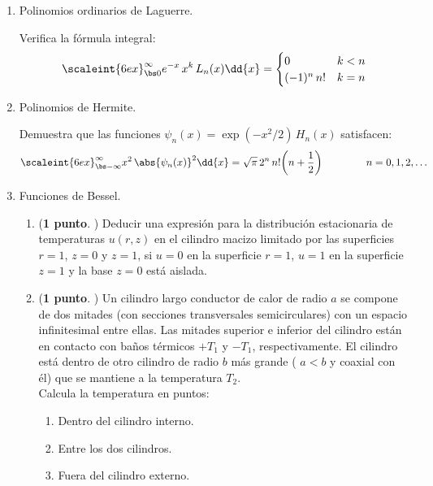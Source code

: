 \begin{enumerate}
\item Polinomios ordinarios de Laguerre.
\par
\noindent
Verifica la fórmula integral:
\begin{align*}
\scaleint{6ex}_{\bs 0}^{\infty} e^{-x} \, x^{k} \, L_{n} (x) \dd{x} = \begin{cases}
0 & k < n \\
(-1)^{n} \, n! & k = n
\end{cases}
\end{align*}
\item Polinomios de Hermite.
\par
\noindent
Demuestra que las funciones $\psi_{n} (x) = \exp(-x^{2}/2) \, H_{n} (x)$ satisfacen:
\begin{align*}
\scaleint{6ex}_{\bs -\infty}^{\infty} x^{2} \, \abs{\psi_{n} (x)}^{2} \dd{x} = \sqrt{\pi} \, 2^{n} \, n! \bigg( n + \dfrac{1}{2} \bigg) \hspace{1.5cm} n = 0, 1, 2, \ldots
\end{align*}
\item Funciones de Bessel.
\begin{enumerate}
\item (\textbf{1 punto}. ) Deducir una expresión para la distribución estacionaria de temperaturas $u(r, z)$ en el cilindro macizo limitado por las superficies $r = 1$, $z = 0$ y $z = 1$, si $u = 0$ en la superficie $r= 1$, $u = 1$ en la superficie $z = 1$ y la base $z = 0$ está aislada.
\item (\textbf{1 punto}. ) Un cilindro largo conductor de calor de radio $a$ se compone de dos mitades (con secciones transversales semicirculares) con un espacio infinitesimal entre ellas. Las mitades superior e inferior del cilindro están en contacto con baños térmicos $+T_{1}$ y $-T_{1}$, respectivamente. El cilindro está dentro de otro cilindro de radio $b$ más grande ( $a < b$ y coaxial con él) que se mantiene a la temperatura $T_{2}$. 
\\
\noindent
Calcula la temperatura en puntos:
\begin{enumerate}[label=\alph*)]
\item Dentro del cilindro interno.
\item Entre los dos cilindros.
\item Fuera del cilindro externo.
\end{enumerate}

\end{enumerate}
\end{enumerate}
